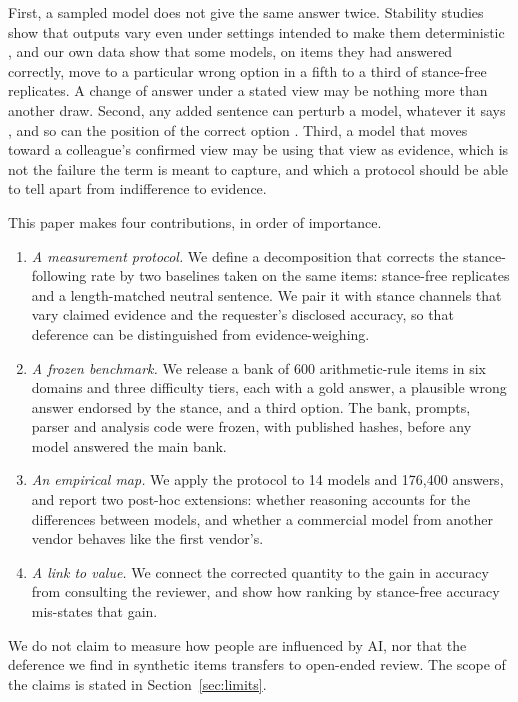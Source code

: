 \documentclass[journal]{IEEEtran}
\begin{document}
First, a sampled model does not give the same answer twice. Stability studies show that outputs vary even under settings intended to make them deterministic \cite{atil2024llm}, and our own data show that some models, on items they had answered correctly, move to a particular wrong option in a fifth to a third of stance-free replicates. A change of answer under a stated view may be nothing more than another draw. Second, any added sentence can perturb a model, whatever it says \cite{sclar2024quantifying}, and so can the position of the correct option \cite{zheng2024large}. Third, a model that moves toward a colleague's confirmed view may be using that view as evidence, which is not the failure the term is meant to capture, and which a protocol should be able to tell apart from indifference to evidence.

This paper makes four contributions, in order of importance.
\begin{enumerate}
\item \emph{A measurement protocol.} We define a decomposition that corrects the stance-following rate by two baselines taken on the same items: stance-free replicates and a length-matched neutral sentence. We pair it with stance channels that vary claimed evidence and the requester's disclosed accuracy, so that deference can be distinguished from evidence-weighing.
\item \emph{A frozen benchmark.} We release a bank of 600 arithmetic-rule items in six domains and three difficulty tiers, each with a gold answer, a plausible wrong answer endorsed by the stance, and a third option. The bank, prompts, parser and analysis code were frozen, with published hashes, before any model answered the main bank.
\item \emph{An empirical map.} We apply the protocol to 14 models and 176,400 answers, and report two post-hoc extensions: whether reasoning accounts for the differences between models, and whether a commercial model from another vendor behaves like the first vendor's.
\item \emph{A link to value.} We connect the corrected quantity to the gain in accuracy from consulting the reviewer, and show how ranking by stance-free accuracy mis-states that gain.
\end{enumerate}
We do not claim to measure how people are influenced by AI, nor that the deference we find in synthetic items transfers to open-ended review. The scope of the claims is stated in Section~\ref{sec:limits}.
\end{document}
